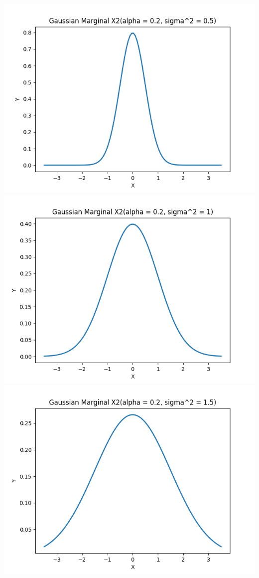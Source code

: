 \documentclass{article}
\begin{document}
\includegraphics[width=\linewidth]{X2(alpha = 0.2, sigma^2 = 0.5).png}
\includegraphics[width=\linewidth]{X2(alpha = 0.2, sigma^2 = 1).png}
\includegraphics[width=\linewidth]{X2(alpha = 0.2, sigma^2 = 1.5).png}
\end{document}
